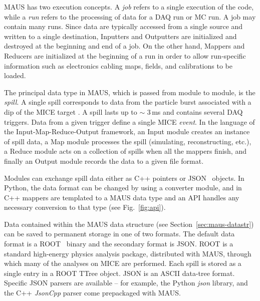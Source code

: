 \documentclass{JINST}
\begin{document}
MAUS has two execution concepts. A \emph{job} refers to a single execution of the code, while a \emph{run} refers to the processing of data for a DAQ run or MC run. A job may contain many runs. Since data are typically accessed from a single source and written to a single destination, Inputters and Outputters are initialized and destroyed at the beginning and end of a job. On the other hand, Mappers and Reducers are initialized at the beginning of a run in order to allow run-specific information such as electronics cabling maps, fields, and calibrations to be loaded.

The principal data type in MAUS, which is passed from module to module, is the \emph{spill}. A single spill corresponds to  data from the particle burst associated with a dip of the MICE target \cite{BeamlineJINST}. A spill lasts up to $\sim$ 3\,ms and contains several DAQ triggers.  Data from a given trigger define a single MICE \emph{event}. In the language of the Input-Map-Reduce-Output framework, an Input module creates an instance of spill data, a Map module processes the spill (simulating, reconstructing, etc.), a Reduce module acts on a collection of spills when all the mappers finish, and finally an Output module records the data to a given file format.

Modules can exchange spill data either as C++ pointers or JSON~\cite{JSON} objects. In Python, the data format can be changed by using a converter module, and in C++ mappers are templated to a MAUS data type and an API  handles any necessary conversion to that type (see Fig.~\ref{fig:api}). 


Data contained within the MAUS data structure (see Section~\ref{sec:maus-datastr}) can be saved to permanent storage in one of two formats. The default data format is a ROOT~\cite{ROOT} binary and the secondary format is JSON. ROOT is a standard high-energy physics analysis package, distributed with MAUS, through which many of the analyses on MICE are performed. Each spill is stored as a single entry in a ROOT TTree object.  JSON is an ASCII data-tree format. Specific JSON parsers are available -- for example, the Python \emph{json} library, and the C++ \emph{JsonCpp} \cite{JSONCPP} parser come prepackaged with MAUS. 
\end{document}
